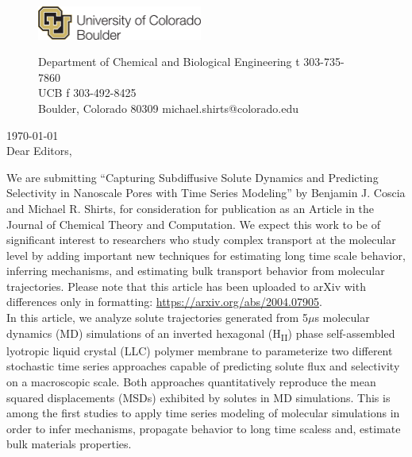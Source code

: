 \documentclass[fontsize=11pt]{article}
\begin{document}
	\graphicspath{{./figures/}}

	\begin{figure}
	\centering
	\begin{minipage}{0.37\textwidth}
	\includegraphics[width=2.14in,left]{CUBoulder.pdf}
	\end{minipage}
	\begin{minipage}{0.62\textwidth}
	\scriptsize
	\noindent Department of Chemical and Biological Engineering \hfill t 303-735-7860~~~~~~~~~~~~~~~~~~ \\
	 UCB \hfill f 303-492-8425~~~~~~~~~~~~~~~~~~ \\
	\noindent Boulder, Colorado 80309 \hfill michael.shirts@colorado.edu \\
	\end{minipage}
	\end{figure}
	
	\noindent \today \\

	\noindent Dear Editors,\\
	
	\newcommand{\ManuscriptTitle}{Capturing Subdiffusive Solute Dynamics and 
	Predicting Selectivity in Nanoscale Pores with Time Series Modeling}
	
	We are submitting ``\ManuscriptTitle'' by Benjamin J. Coscia
        and Michael R.  Shirts, for consideration for publication as
        an Article in the Journal of Chemical Theory and
        Computation. We expect this work to be of significant interest
        to researchers who study complex transport at the molecular
        level by adding important new techniques for estimating long
        time scale behavior, inferring mechanisms, and estimating bulk
        transport behavior from molecular trajectories. Please note that this article has been uploaded to arXiv with
	differences only in formatting: \href{https://arxiv.org/abs/2004.07905}{https://arxiv.org/abs/2004.07905}. \\
	
	In this article, we analyze solute trajectories generated from
        5$\mu$s molecular dynamics (MD) simulations of an inverted
        hexagonal (H\textsubscript{II}) phase self-assembled lyotropic
        liquid crystal (LLC) polymer membrane to parameterize two
        different stochastic time series approaches capable of
        predicting solute flux and selectivity on a macroscopic
        scale. Both approaches quantitatively reproduce the mean
        squared displacements (MSDs) exhibited by solutes in MD
        simulations. This is among the first studies to apply time
        series modeling of molecular simulations in order to infer
        mechanisms, propagate behavior to long time scaless and,
        estimate bulk materials properties.\\
\end{document}
